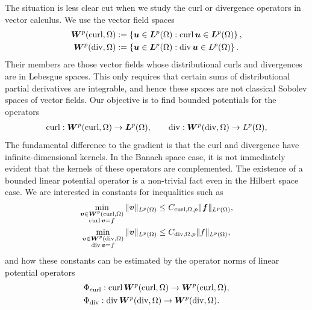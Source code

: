 \documentclass[10pt,a4paper]{article}
\begin{document}
The situation is less clear cut when we study the curl or divergence operators in vector calculus.
We use the vector field spaces
\begin{align*}
    \bm{W}^{p}(\operatorname{curl},\Omega) &:= \left\{ \bm{u} \in \bm{L}^{p}(\Omega) : \operatorname{curl} \bm{u} \in \bm{L}^{p}(\Omega) \right\}
    ,
    \\
    \bm{W}^{p}(\operatorname{div},\Omega) &:= \left\{ \bm{u} \in \bm{L}^{p}(\Omega) : \operatorname{div} \bm{u} \in L^{p}(\Omega) \right\}
    .
\end{align*}
Their members are those vector fields whose distributional curls and divergences are in Lebesgue spaces. 
This only requires that certain sums of distributional partial derivatives are integrable, 
and hence these spaces are not classical Sobolev spaces of vector fields. 
Our objective is to find bounded potentials for the operators 
\begin{align*}
    \operatorname{curl} : \bm{W}^{p}(\operatorname{curl},\Omega) \rightarrow \bm{L}^{p}(\Omega),
    \qquad 
    \operatorname{div} : \bm{W}^{p}(\operatorname{div},\Omega) \rightarrow L^{p}(\Omega),
\end{align*}
The fundamental difference to the gradient is that the curl and divergence have infinite-dimensional kernels. 
In the Banach space case, it is not immediately evident that the kernels of these operators are complemented.
The existence of a bounded linear potential operator is a non-trivial fact even in the Hilbert space case.
We are interested in constants for inequalities such as 
\begin{align*}
    \min\limits_{ \substack{ \bfv \in \bfW^{p}(\curl,\Omega) \\ \curl \bfv = \bff } } 
    \| \bfv \|_{L^{p}(\Omega)}
    &\leq 
    C_{\curl,\Omega,p}
    \| \bff \|_{L^{p}(\Omega)}
    ,
    \\%
    \min\limits_{ \substack{ \bfv \in \bfW^{p}(\divergence,\Omega) \\ \divergence \bfv = f } } 
    \| \bfv \|_{L^{p}(\Omega)}
    &\leq 
    C_{\divergence,\Omega,p}
    \| f \|_{L^{p}(\Omega)}
    ,
\end{align*}
and how these constants can be estimated by the operator norms of linear potential operators 
\begin{align*}
    &\Phi_{\operatorname{curl}} : \operatorname{curl} \bm{W}^{p}(\operatorname{curl},\Omega) \rightarrow \bm{W}^{p}(\operatorname{curl},\Omega)
    ,
    \\
    &\Phi_{\operatorname{div}} : \operatorname{div} \bm{W}^{p}(\operatorname{div},\Omega) \rightarrow \bm{W}^{p}(\operatorname{div},\Omega)
    .
\end{align*}
\end{document}
